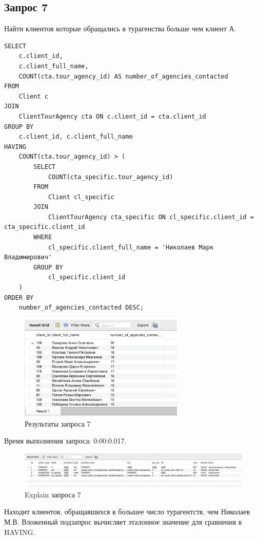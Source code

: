 \documentclass[11pt,a4paper,final]{article}
\begin{document}
\subsection{Запрос 7}
Найти клиентов которые обращались в турагенства больше чем клиент А.
\begin{lstlisting}[style=sqlstyle, label=sql:query1]
SELECT
    c.client_id,
    c.client_full_name,
    COUNT(cta.tour_agency_id) AS number_of_agencies_contacted
FROM
    Client c
JOIN
    ClientTourAgency cta ON c.client_id = cta.client_id
GROUP BY
    c.client_id, c.client_full_name
HAVING
    COUNT(cta.tour_agency_id) > (
        SELECT
            COUNT(cta_specific.tour_agency_id)
        FROM
            Client cl_specific
        JOIN
            ClientTourAgency cta_specific ON cl_specific.client_id = cta_specific.client_id
        WHERE
            cl_specific.client_full_name = 'Николаев Марк Владимирович' 
        GROUP BY
            cl_specific.client_id 
    )
ORDER BY
    number_of_agencies_contacted DESC;
\end{lstlisting}
\begin{figure}[h!]
    \centering
    \includegraphics[width=0.7\textwidth]{24.png} 
    \caption{Результаты запроса 7}
\end{figure}
{\centering
Время выполнения запроса: 0:00:0.017.\par}
\begin{figure}[H]
    \centering
    \includegraphics[width=\textwidth]{25.png} 
    \caption{Explain запроса 7}
\end{figure}

Находит клиентов, обращавшихся в большее число турагентств, чем Николаев М.В. Вложенный подзапрос вычисляет эталонное значение для сравнения в HAVING.
\end{document}
